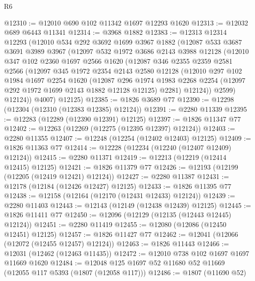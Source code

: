 \begin{lexlean}{R6}
\begin{coremodule}
@12310 := @12010 @690 @102 @11342 @1697 @12293 @1620
@12313 := @12032 @689 @6443 @11341
@12314 := @3968 @1882
@12383 := @12313
    @12314
    @12293
    (@12010
      @534
      @292
      @3692
      @1699
      @3967
      @1882
      (@12087
        @533
        @3687
        @3691
        @3989
        @3967
        (@12097
          @532
          @1972
          @3686
          @2143
          @3988
          @12128
          (@12010
            @347
            @102
            @2360
            @1697
            @2566
            @1620
            (@12087
              @346
              @2355
              @2359
              @2581
              @2566
              (@12097
                @345
                @1972
                @2354
                @2143
                @2580
                @12128
                (@12010
                  @297
                  @102
                  @1984
                  @1697
                  @2254
                  @1620
                  (@12087
                    @296
                    @1974
                    @1983
                    @2268
                    @2254
                    (@12097 @292 @1972 @1699 @2143 @1882 @12128 @12125)
                    @2281)
                  @12124))
              @2599)
            @12124))
        @4007)
      @12125)
@12385 := @1826 @3689 @77
@12390 := @12298 (@12304 (@12310 (@12383 @12385) @12124))
@12391 := @2280 @11339
@12395 := @12283 (@12289 (@12390 @12391) @12125)
@12397 := @1826 @11347 @77
@12402 := @12263 (@12269 (@12275 (@12395 @12397) @12124))
@12403 := @2280 @11355
@12407 := @12248 (@12254 (@12402 @12403) @12125)
@12409 := @1826 @11363 @77
@12414 := @12228 (@12234 (@12240 (@12407 @12409) @12124))
@12415 := @2280 @11371
@12419 := @12213 (@12219 (@12414 @12415) @12125)
@12421 := @1826 @11379 @77
@12426 := @12193 (@12199 (@12205 (@12419 @12421) @12124))
@12427 := @2280 @11387
@12431 := @12178 (@12184 (@12426 @12427) @12125)
@12433 := @1826 @11395 @77
@12438 := @12158 (@12164 (@12170 (@12431 @12433) @12124))
@12439 := @2280 @11403
@12443 := @12143 (@12149 (@12438 @12439) @12125)
@12445 := @1826 @11411 @77
@12450 := @12096 (@12129 (@12135 (@12443 @12445) @12124))
@12451 := @2280 @11419
@12455 := @12080 (@12086 (@12450 @12451) @12125)
@12457 := @1826 @11427 @77
@12462 := @12041 (@12066 (@12072 (@12455 @12457) @12124))
@12463 := @1826 @11443
@12466 := @12031 (@12462 (@12463 @11435))
@12472 := @12010 @738 @102 @1697 @1697 @11669 @1620
@12484 := @12048 @125 @1697 @52 @11680 @52 @11669 (@12055 @117 @5393 (@1807 (@12058 @117)))
@12486 := @1807 (@11690 @52)

\end{coremodule}
\end{lexlean}

